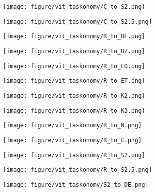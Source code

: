 \begin{figure}[h]
\begin{subfigure}{\figlength\textwidth}
\texttt{[image: figure/vit\_taskonomy/C\_to\_S2.png]}
\end{subfigure}
\begin{subfigure}{\figlength\textwidth}
\texttt{[image: figure/vit\_taskonomy/C\_to\_S2.5.png]}
\end{subfigure}
\begin{subfigure}{\figlength\textwidth}
\texttt{[image: figure/vit\_taskonomy/R\_to\_DE.png]}
\end{subfigure}
\begin{subfigure}{\figlength\textwidth}
\texttt{[image: figure/vit\_taskonomy/R\_to\_DZ.png]}
\end{subfigure}
\begin{subfigure}{\figlength\textwidth}
\texttt{[image: figure/vit\_taskonomy/R\_to\_EO.png]}
\end{subfigure}
\begin{subfigure}{\figlength\textwidth}
\texttt{[image: figure/vit\_taskonomy/R\_to\_ET.png]}
\end{subfigure}
\begin{subfigure}{\figlength\textwidth}
\texttt{[image: figure/vit\_taskonomy/R\_to\_K2.png]}
\end{subfigure}
\begin{subfigure}{\figlength\textwidth}
\texttt{[image: figure/vit\_taskonomy/R\_to\_K3.png]}
\end{subfigure}
\begin{subfigure}{\figlength\textwidth}
\texttt{[image: figure/vit\_taskonomy/R\_to\_N.png]}
\end{subfigure}
\begin{subfigure}{\figlength\textwidth}
\texttt{[image: figure/vit\_taskonomy/R\_to\_C.png]}
\end{subfigure}
\begin{subfigure}{\figlength\textwidth}
\texttt{[image: figure/vit\_taskonomy/R\_to\_S2.png]}
\end{subfigure}
\begin{subfigure}{\figlength\textwidth}
\texttt{[image: figure/vit\_taskonomy/R\_to\_S2.5.png]}
\end{subfigure}
\begin{subfigure}{\figlength\textwidth}
\texttt{[image: figure/vit\_taskonomy/S2\_to\_DE.png]}
\end{subfigure}

\end{figure}
